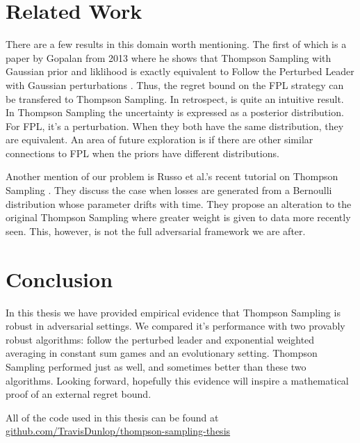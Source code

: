 \documentclass[10pt,a4paper]{article} %
\begin{document}
	\section{Related Work}
	
	There are a few results in this domain worth mentioning.  The first of which is a paper by Gopalan from 2013 where he shows that Thompson Sampling with Gaussian prior and liklihood is exactly equivalent to Follow the Perturbed Leader with Gaussian perturbations \cite{FPL_TS_Gaussian}.  Thus, the regret bound on the FPL strategy can be transfered to Thompson Sampling.  In retrospect, is quite an intuitive result.  In Thompson Sampling the uncertainty is expressed as a posterior distribution. For FPL, it's a perturbation.  When they both have the same distribution, they are equivalent. 	An area of future exploration is if there are other similar connections to FPL when the priors have different distributions.
	
	Another mention of our problem is Russo et al.'s recent tutorial on Thompson Sampling \cite{Russo_TS}.  They discuss the case when losses are generated from a Bernoulli distribution whose parameter drifts with time.  They propose an alteration to the original Thompson Sampling where greater weight is given to data more recently seen.  This, however, is not the full adversarial framework we are after.

	\section{Conclusion}
	
	In this thesis we have provided empirical evidence that Thompson Sampling is robust in adversarial settings.  We compared it's performance with two provably robust algorithms: follow the perturbed leader and exponential weighted averaging in constant sum games and an evolutionary setting.  Thompson Sampling performed just as well, and sometimes better than these two algorithms.  Looking forward, hopefully this evidence will inspire a mathematical proof of an external regret bound.
	
	All of the code used in this thesis can be found at \url{github.com/TravisDunlop/thompson-sampling-thesis}
	
	
	\nocite{*}
	
	
\end{document}
